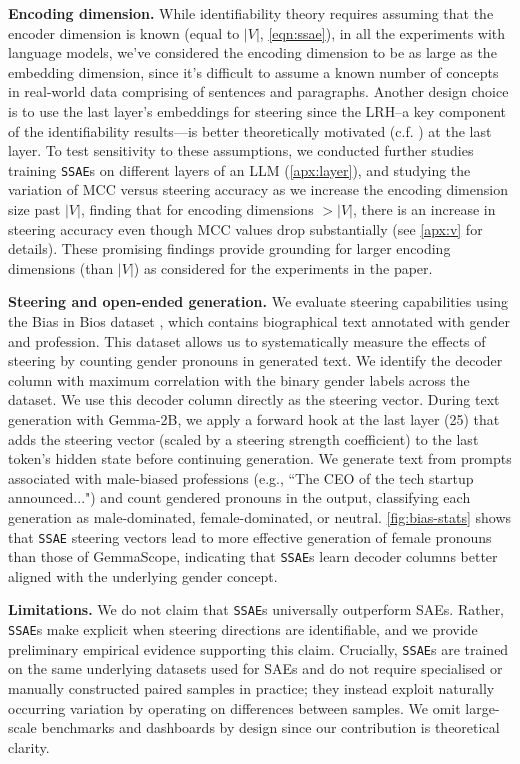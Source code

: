 \documentclass{article}
\newcommand{\isae}{\texttt{SSAE}\xspace}
\begin{document}
\textbf{Encoding dimension.} While identifiability theory requires assuming that the encoder dimension is known (equal to $|V|$, \cref{eqn:ssae}), in all the experiments with language models, we've considered the encoding dimension to be as large as the embedding dimension, since it's difficult to assume a known number of concepts in real-world data comprising of sentences and paragraphs. Another design choice is to use the last layer's embeddings for steering since the LRH--a key component of the identifiability results---is better theoretically motivated (c.f. \citep{marconato2024all}) at the last layer. To test sensitivity to these assumptions, we conducted further studies training {\isae}s on different layers of an LLM (\cref{apx:layer}), and studying the variation of $\text{MCC}$ versus steering accuracy as we increase the encoding dimension size past $|V|$, finding that for encoding dimensions $>|V|$, there is an increase in steering accuracy even though $\text{MCC}$ values drop substantially (see \cref{apx:v} for details). These promising findings provide grounding for larger encoding dimensions (than $|V|$) as considered for the experiments in the paper. 

\textbf{Steering and open-ended generation.}  We evaluate steering capabilities using
   the Bias in Bios dataset \citep{De_Arteaga_2019}, which contains biographical
  text annotated with gender and profession. This dataset allows us to
  systematically measure the effects of steering by counting gender pronouns
  in generated text. We identify the decoder
  column with maximum correlation with the binary gender labels across
  the dataset. We use this decoder
  column directly as the steering vector. During text generation with Gemma-2B, we apply
   a forward hook at the last layer (25) that adds the steering vector (scaled by a
  steering strength coefficient) to the last token's hidden state before
  continuing generation. We generate text from prompts associated with
  male-biased professions (e.g., ``The CEO of the tech startup
  announced...") and count gendered pronouns in the output, classifying each
   generation as male-dominated, female-dominated, or neutral.
  \cref{fig:bias-stats} shows that {\isae} steering vectors lead to more
  effective generation of female pronouns than those of GemmaScope,
  indicating that {\isae}s learn decoder columns better aligned with the
  underlying gender concept.

\noindent
\textbf{Limitations.} We do not claim that \isae{}s universally outperform SAEs. Rather, \isae{}s make explicit when steering directions are identifiable, and we provide preliminary empirical evidence supporting this claim. Crucially, \isae{}s are trained on the same underlying datasets used for SAEs and do not require specialised or manually constructed paired samples in practice; they instead exploit naturally occurring variation by operating on differences between samples. We omit large-scale benchmarks and dashboards by design since our contribution is theoretical clarity.
\end{document}
